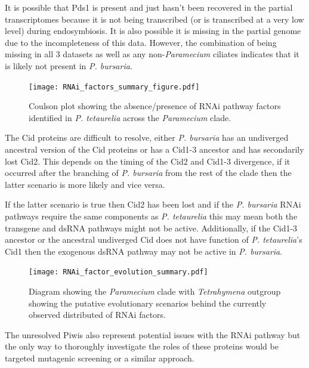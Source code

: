 It is possible that Pds1 is present and just hasn't been recovered 
in the partial transcriptomes because it is not being transcribed (or is 
transcribed at a very low level) during endosymbiosis.  It is also
possible it is missing in the partial genome due to the incompleteness
of this data.  However, the combination of being missing in all 3 datasets
as well as any non-\textit{Paramecium} ciliates indicates that
it is likely not present in \textit{P. bursaria}.

\begin{figure}
    \centering
    \texttt{[image: RNAi\_factors\_summary\_figure.pdf]}
    \caption[Summary of RNAi Factors in \textit{Paramecium} species]{Coulson plot
        showing the absence/presence of RNAi pathway factors
    identified in \textit{P. tetaurelia} \citep{Marker2014} across the \textit{Paramecium}
clade.}
    \label{fig:rnai_summary}
\end{figure}

The Cid proteins are difficult to resolve, either \textit{P. bursaria}
has an undiverged ancestral version of the Cid proteins or has a
Cid1-3 ancestor and has secondarily lost Cid2.
This depends on the timing of the Cid2 and Cid1-3 divergence, if
it occurred after the branching of \textit{P. bursaria} from the rest
of the clade then the latter scenario is more likely and vice versa.

If the latter scenario is true then Cid2 has been lost 
and if the \textit{P. bursaria} RNAi
pathways require the same components as \textit{P. tetaurelia} this may
mean both the transgene and dsRNA pathways might not be active. 
Additionally, if the Cid1-3 ancestor or the ancestral undiverged
Cid does not have function of \textit{P. tetaurelia}'s Cid1 then
the exogenous dsRNA pathway may not be active in \textit{P. bursaria}.


\begin{figure}
    \texttt{[image: RNAi\_factor\_evolution\_summary.pdf]}
    \caption[Summary of RNAi Factors Evolutionary Scenarios in \textit{Paramecium} species]{
        Diagram showing the \textit{Paramecium} clade with \textit{Tetrahymena} outgroup 
        showing the putative evolutionary scenarios behind the currently
        observed distributed of RNAi factors.
    }
    \label{fig:rnai_evol_summary}
\end{figure}

The unresolved Piwis also represent potential issues with the RNAi pathway
but the only way to thoroughly investigate the roles of these proteins would
be targeted mutagenic screening or a similar approach.

